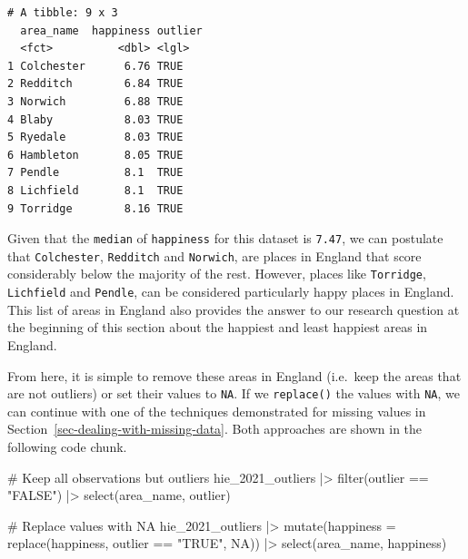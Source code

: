 \documentclass[
  letterpaper,
  DIV=11,
  numbers=noendperiod]{scrreprt}
\newenvironment{Shaded}{\begin{snugshade}}{\end{snugshade}}
\newcommand{\AttributeTok}[1]{\textcolor[rgb]{0.40,0.45,0.13}{#1}}
\newcommand{\CommentTok}[1]{\textcolor[rgb]{0.37,0.37,0.37}{#1}}
\newcommand{\ConstantTok}[1]{\textcolor[rgb]{0.56,0.35,0.01}{#1}}
\newcommand{\FunctionTok}[1]{\textcolor[rgb]{0.28,0.35,0.67}{#1}}
\newcommand{\NormalTok}[1]{\textcolor[rgb]{0.00,0.23,0.31}{#1}}
\newcommand{\SpecialCharTok}[1]{\textcolor[rgb]{0.37,0.37,0.37}{#1}}
\newcommand{\StringTok}[1]{\textcolor[rgb]{0.13,0.47,0.30}{#1}}
\begin{document}
\begin{verbatim}
# A tibble: 9 x 3
  area_name  happiness outlier
  <fct>          <dbl> <lgl>  
1 Colchester      6.76 TRUE   
2 Redditch        6.84 TRUE   
3 Norwich         6.88 TRUE   
4 Blaby           8.03 TRUE   
5 Ryedale         8.03 TRUE   
6 Hambleton       8.05 TRUE   
7 Pendle          8.1  TRUE   
8 Lichfield       8.1  TRUE   
9 Torridge        8.16 TRUE   
\end{verbatim}

Given that the \texttt{median} of \texttt{happiness} for this dataset is
\texttt{7.47}, we can postulate that \texttt{Colchester},
\texttt{Redditch} and \texttt{Norwich}, are places in England that score
considerably below the majority of the rest. However, places like
\texttt{Torridge}, \texttt{Lichfield} and \texttt{Pendle}, can be
considered particularly happy places in England. This list of areas in
England also provides the answer to our research question at the
beginning of this section about the happiest and least happiest areas in
England.

From here, it is simple to remove these areas in England (i.e.~keep the
areas that are not outliers) or set their values to \texttt{NA}. If we
\texttt{replace()} the values with \texttt{NA}, we can continue with one
of the techniques demonstrated for missing values in
Section~\ref{sec-dealing-with-missing-data}. Both approaches are shown
in the following code chunk.

\begin{Shaded}
\begin{Highlighting}[]
\CommentTok{\# Keep all observations but outliers}
\NormalTok{hie\_2021\_outliers }\SpecialCharTok{|\textgreater{}}
  \FunctionTok{filter}\NormalTok{(outlier }\SpecialCharTok{==} \StringTok{"FALSE"}\NormalTok{) }\SpecialCharTok{|\textgreater{}}
  \FunctionTok{select}\NormalTok{(area\_name, outlier)}
\end{Highlighting}
\end{Shaded}

\begin{Shaded}
\begin{Highlighting}[]
\CommentTok{\# Replace values with NA}
\NormalTok{hie\_2021\_outliers }\SpecialCharTok{|\textgreater{}}
  \FunctionTok{mutate}\NormalTok{(}\AttributeTok{happiness =} \FunctionTok{replace}\NormalTok{(happiness, outlier }\SpecialCharTok{==} \StringTok{"TRUE"}\NormalTok{, }\ConstantTok{NA}\NormalTok{)) }\SpecialCharTok{|\textgreater{}}
  \FunctionTok{select}\NormalTok{(area\_name, happiness)}
\end{Highlighting}
\end{Shaded}
\end{document}
